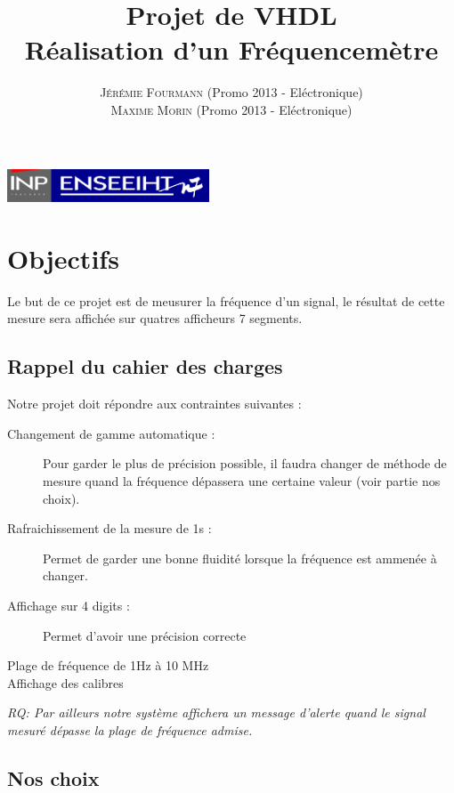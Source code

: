 \documentclass[a4paper,11pt]{article}
\title{\textbf{ \huge{Projet de VHDL}}  \\{\Large Réalisation d'un Fréquencemètre}}
\author{
\textsc{Jérémie Fourmann} (Promo 2013 - Eléctronique)\\ %
\textsc{Maxime Morin} (Promo 2013 - Eléctronique)\\ %
}
\begin{document}
\pagestyle{plain}

\maketitle
\begin{center}
\includegraphics[width=6cm]{inp-enseeiht.pdf}   
\end{center}

\vspace{1cm}
\renewcommand{\contentsname}{Plan}
\tableofcontents
\vspace{2cm}

\newpage
\section{Objectifs}
Le but de ce projet est de meusurer la fréquence d'un signal, le résultat de cette mesure sera affichée sur quatres afficheurs 7 segments.\\
\subsection{Rappel du cahier des charges}
Notre projet doit répondre aux contraintes suivantes :
\begin{description}
 \item[Changement de gamme automatique :] Pour garder le plus de précision possible, 
il faudra changer de méthode de mesure quand la fréquence dépassera une certaine valeur (voir partie nos choix).
\item[Rafraichissement de la mesure de 1s :] Permet de garder une bonne fluidité lorsque la fréquence est ammenée à changer.
\item[Affichage sur 4 digits :] Permet d'avoir une précision correcte
\item[Plage de fréquence de 1Hz à 10 MHz]
\item[Affichage des calibres]  
\end{description}
\vspace{.5cm}
\emph{RQ: Par ailleurs notre système affichera un message d'alerte quand le signal mesuré dépasse la plage de fréquence admise.}

\subsection{Nos choix}
\end{document}
